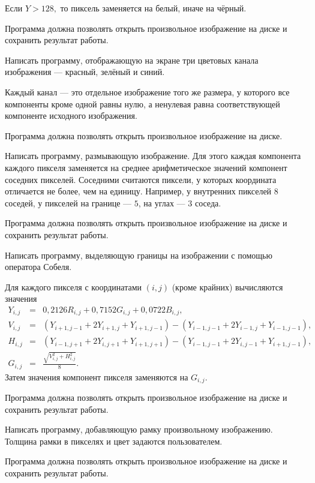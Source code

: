 Если $Y > 128,$ то пиксель заменяется на белый, иначе на чёрный.

Программа должна позволять открыть произвольное изображение на диске и
сохранить результат работы.

\task Написать программу, отображающую на экране три цветовых канала
изображения — красный, зелёный и синий.

Каждый канал — это отдельное изображение того же размера, у которого
все компоненты кроме одной равны нулю, а ненулевая равна
соответствующей компоненте исходного изображения.

Программа должна позволять открыть произвольное изображение на диске.

\task Написать программу, размывающую
изображение. Для этого каждая компонента
каждого пикселя заменяется на среднее арифметическое значений
компонент соседних пикселей. Соседними считаются пиксели, у которых
координата отличается не более, чем на единицу. Например, у внутренних
пикселей $8$ соседей, у пикселей на границе — $5$, на углах — $3$
соседа.

Программа должна позволять открыть произвольное изображение на диске и
сохранить результат работы.

\task Написать программу, выделяющую границы на изображении с помощью
оператора Собеля.

Для каждого пикселя с координатами $(i,j)$ (кроме крайних) вычисляются
значения
\begin{eqnarray*}
Y_{i,j} &=& 0{,}2126 R_{i,j} + 0{,}7152 G_{i,j} + 0{,}0722 B_{i,j},\\
V_{i,j} &=& (Y_{i+1,j-1} + 2 Y_{i+1,j} + Y_{i+1,j-1}) - (Y_{i-1,j-1} + 2 Y_{i-1,j} + Y_{i-1,j-1}),\\
H_{i,j} &=& (Y_{i-1,j+1} + 2 Y_{i,j+1} + Y_{i+1,j+1}) - (Y_{i-1,j-1} + 2 Y_{i,j-1} + Y_{i+1,j-1}),\\
G_{i,j} &=& \frac{\sqrt{V_{i,j}^2+H_{i,j}^2}}{8}.
\end{eqnarray*}
Затем значения компонент пикселя заменяются на $G_{i,j}.$

Программа должна позволять открыть произвольное изображение на диске и
сохранить результат работы.

\task Написать программу, добавляющую рамку произвольному
изображению. Толщина рамки в пикселях и цвет задаются пользователем.

Программа должна позволять открыть произвольное изображение на диске и
сохранить результат работы.

